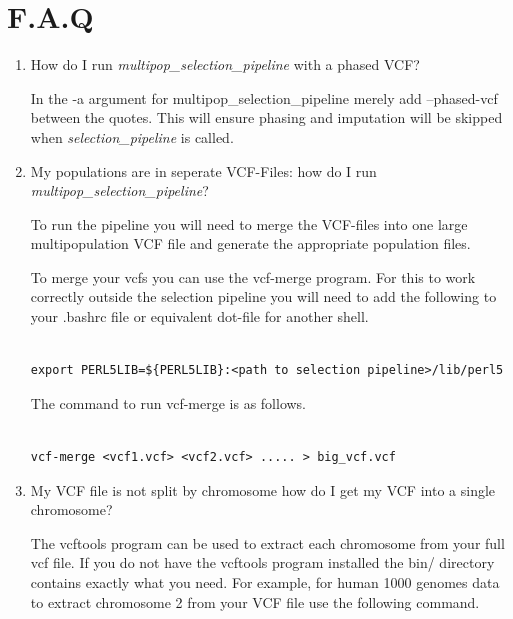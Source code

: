 \documentclass[a4paper,10pt]{article}
\begin{document}
\section{F.A.Q}
\begin{enumerate}
\item How do I run \emph{multipop\_selection\_pipeline} with a phased VCF?

In the -a argument for multipop\_selection\_pipeline merely add --phased-vcf
between the quotes. This will ensure phasing and imputation will be
skipped when \emph{selection\_pipeline} is called.


\item My populations are in seperate VCF-Files: how do I run \emph{multipop\_selection\_pipeline}?

To run the pipeline you will need to merge the VCF-files into one
large multipopulation VCF file and generate the appropriate population
files. 

To merge your vcfs you can use the vcf-merge program. For this to work
correctly outside the selection pipeline you will need to add the
following to your .bashrc file or equivalent dot-file for another
shell.\\

\begin{verbatim}

export PERL5LIB=${PERL5LIB}:<path to selection pipeline>/lib/perl5

\end{verbatim}

The command to run vcf-merge is as follows.

\begin{verbatim}

vcf-merge <vcf1.vcf> <vcf2.vcf> ..... > big_vcf.vcf

\end{verbatim}

\item My VCF file is not split by chromosome how do I get my VCF into a single chromosome?

The vcftools program can be used to extract each chromosome from your
full vcf file. If you do not have the vcftools program installed the
bin/ directory  contains exactly what you need. For example, for human
1000 genomes data to extract chromosome 2 from your VCF file use the
following command. 

\begin{verbatim}


\end{verbatim}
\end{enumerate}
\end{document}
